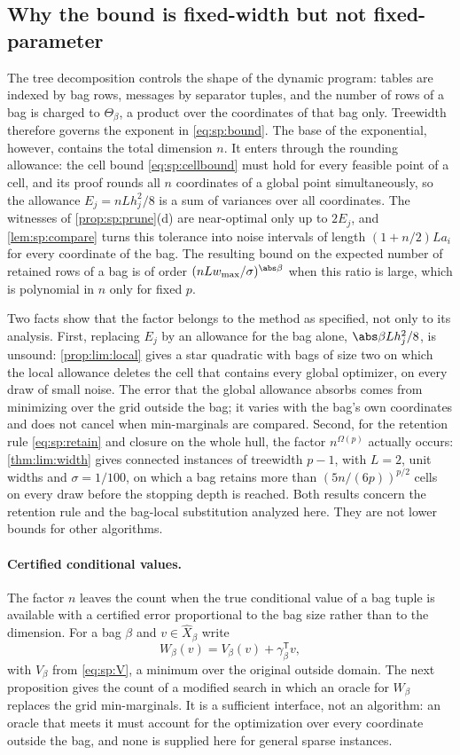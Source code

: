 \subsection{Why the bound is fixed-width but not fixed-parameter}\label{sec:sp:width}

The tree decomposition controls the shape of the dynamic program: tables
are indexed by bag rows, messages by separator tuples, and the number of
rows of a bag is charged to $\Theta_\beta$, a product over the coordinates
of that bag only. Treewidth therefore governs the exponent in
\eqref{eq:sp:bound}. The base of the exponential, however, contains the
total dimension $n$. It enters through the rounding allowance: the cell bound
\eqref{eq:sp:cellbound} must hold for every feasible point of a cell, and
its proof rounds all $n$ coordinates of a global point simultaneously, so
the allowance $E_j=nLh_j^2/8$ is a sum of variances over all coordinates.
The witnesses of \cref{prop:sp:prune}(d) are near-optimal only up to
$2E_j$, and \cref{lem:sp:compare} turns this tolerance into noise intervals
of length $(1+n/2)La_i$ for every coordinate of the bag. The resulting bound
on the expected number of retained rows of a bag is of order
$(nLw_{\max}/\sigma)^{\abs\beta}$ when this ratio is large, which is polynomial
in $n$ only for fixed $p$.

Two facts show that the factor belongs to the method as specified, not
only to its analysis. First, replacing $E_j$ by an allowance for the bag
alone, $\abs\beta Lh_j^2/8$, is unsound: \cref{prop:lim:local} gives a star
quadratic with bags of size two on which the local allowance deletes the
cell that contains every global optimizer, on every draw of small noise. The
error that the global allowance absorbs comes from minimizing over the grid
outside the bag; it varies with the bag's own coordinates and does not
cancel when min-marginals are compared. Second, for the retention rule
\eqref{eq:sp:retain} and closure on the whole hull, the factor
$n^{\Omega(p)}$ actually occurs: \cref{thm:lim:width} gives connected
instances of treewidth $p-1$, with $L=2$, unit widths and $\sigma=1/100$,
on which a bag retains more than $(5n/(6p))^{p/2}$ cells on every draw
before the stopping depth is reached. Both results concern the retention
rule and the bag-local substitution analyzed here. They are not lower
bounds for other algorithms.

\paragraph{Certified conditional values.}
The factor $n$ leaves the count when the true conditional value of a bag
tuple is available with a certified error proportional to the bag size
rather than to the dimension. For a bag $\beta$ and $v\in\widehat X_\beta$
write
\[
 W_\beta(v)=V_\beta(v)+\gamma_\beta^{\mathsf T}v ,
\]
with $V_\beta$ from \eqref{eq:sp:V}, a minimum over the original outside
domain. The next proposition gives the count of a modified search in which
an oracle for $W_\beta$ replaces the grid min-marginals. It is a sufficient
interface, not an algorithm: an oracle that meets it must account for the
optimization over every coordinate outside the bag, and none is supplied
here for general sparse instances.

